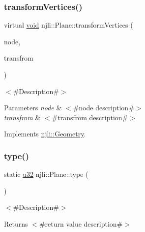 \subsubsection{\texorpdfstring{transform\+Vertices()}{transformVertices()}}
{\footnotesize\ttfamily virtual \mbox{\hyperlink{_thread_8h_af1e856da2e658414cb2456cb6f7ebc66}{void}} njli\+::\+Plane\+::transform\+Vertices (\begin{DoxyParamCaption}\item[{\mbox{\hyperlink{classnjli_1_1_node}{Node}} $\ast$}]{node,  }\item[{const bt\+Transform \&}]{transfrom }\end{DoxyParamCaption})\hspace{0.3cm}{\ttfamily [virtual]}}

$<$\#\+Description\#$>$


\begin{DoxyParams}{Parameters}
{\em node} & $<$\#node description\#$>$ \\
\hline
{\em transfrom} & $<$\#transfrom description\#$>$ \\
\hline
\end{DoxyParams}


Implements \mbox{\hyperlink{classnjli_1_1_geometry_a25fefe3f656bdcb8c88d2fd4d2f48df1}{njli\+::\+Geometry}}.

\mbox{\label{classnjli_1_1_plane_ae6dc5ea1dbfbfed13d99ca25ef4b36d4}} 
\subsubsection{\texorpdfstring{type()}{type()}}
{\footnotesize\ttfamily static \mbox{\hyperlink{_util_8h_a10e94b422ef0c20dcdec20d31a1f5049}{u32}} njli\+::\+Plane\+::type (\begin{DoxyParamCaption}{ }\end{DoxyParamCaption})\hspace{0.3cm}{\ttfamily [static]}}

$<$\#\+Description\#$>$

\begin{DoxyReturn}{Returns}
$<$\#return value description\#$>$ 
\end{DoxyReturn}
\mbox{\label{classnjli_1_1_plane_a5a5600ceb6d93991c31bed8249ab0e65}} 
